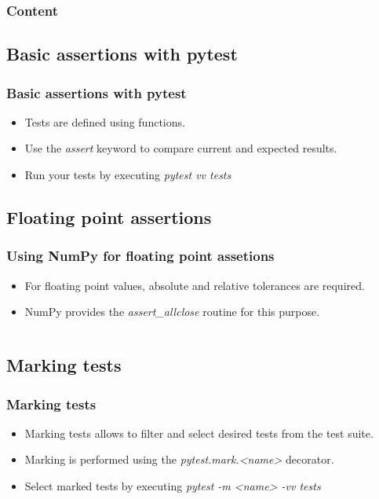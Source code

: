 \documentclass[t]{beamer}
\begin{document}
\begin{frame}
  \frametitle{Content}
  \tableofcontents[currentsection]
  \vspace{200pt}  %
\end{frame}


\subsection{Basic assertions with pytest}
\begin{frame}[fragile=singleslide]
  \frametitle{Basic assertions with pytest}

   \begin{itemize}
        \item Tests are defined using functions.
        \item Use the \textit{assert} keyword to compare current and expected results.
        \item Run your tests by executing \textit{pytest vv tests}
   \end{itemize}

\end{frame}

\subsection{Floating point assertions}
\begin{frame}[fragile=singleslide]
  \frametitle{Using NumPy for floating point assetions}

   \begin{itemize}
        \item For floating point values, absolute and relative tolerances are required.
        \item NumPy provides the \textit{assert\_allclose} routine for this purpose.
   \end{itemize}


   \inputminted[fontsize=\footnotesize]{python}{code/floating_point_assertion.py}


\end{frame}

\subsection{Marking tests}
\begin{frame}[fragile=singleslide]
  \frametitle{Marking tests}

   \begin{itemize}
       \item Marking tests allows to filter and select desired tests from the test suite.
       \item Marking is performed using the \textit{pytest.mark.<name>} decorator.
       \item Select marked tests by executing \textit{pytest -m <name> -vv tests}
   \end{itemize}

\end{frame}
\end{document}
